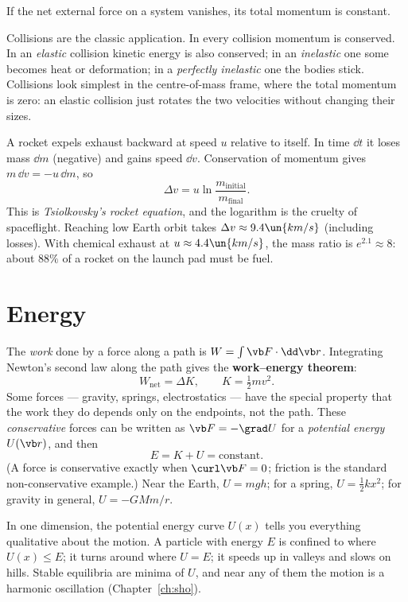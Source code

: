 \begin{law}
If the net external force on a system vanishes, its total momentum is constant.
\end{law}

Collisions are the classic application. In every collision momentum is conserved. In an \emph{elastic} collision kinetic energy is also conserved; in an \emph{inelastic} one some becomes heat or deformation; in a \emph{perfectly inelastic} one the bodies stick. Collisions look simplest in the centre-of-mass frame, where the total momentum is zero: an elastic collision just rotates the two velocities without changing their sizes.

\begin{example}
A rocket expels exhaust backward at speed $u$ relative to itself. In time $\dd t$ it loses mass $\dd m$ (negative) and gains speed $\dd v$. Conservation of momentum gives $m\,\dd v = -u\,\dd m$, so
\[
  \Delta v = u\ln\frac{m_{\text{initial}}}{m_{\text{final}}} .
\]
This is \emph{Tsiolkovsky's rocket equation}, and the logarithm is the cruelty of spaceflight. Reaching low Earth orbit takes $\Delta v\approx9.4\un{km/s}$ (including losses). With chemical exhaust at $u\approx4.4\un{km/s}$, the mass ratio is $e^{2.1}\approx 8$: about $88\%$ of a rocket on the launch pad must be fuel.
\end{example}

\section{Energy}

The \emph{work} done by a force along a path is $W = \int\vb F\cdot\dd\vb r$. Integrating Newton's second law along the path gives the \textbf{work--energy theorem}:
\[
  W_{\text{net}} = \Delta K, \qquad K = \tfrac12 mv^{2}.
\]
Some forces --- gravity, springs, electrostatics --- have the special property that the work they do depends only on the endpoints, not the path. These \emph{conservative} forces can be written as $\vb F = -\grad U$ for a \emph{potential energy} $U(\vb r)$, and then
\[
  E = K + U = \text{constant}.
\]
(A force is conservative exactly when $\curl\vb F=0$; friction is the standard non-conservative example.) Near the Earth, $U = mgh$; for a spring, $U=\tfrac12kx^2$; for gravity in general, $U = -GMm/r$.

\begin{keyidea}
In one dimension, the potential energy curve $U(x)$ tells you everything qualitative about the motion. A particle with energy $E$ is confined to where $U(x)\le E$; it turns around where $U = E$; it speeds up in valleys and slows on hills. Stable equilibria are minima of $U$, and near any of them the motion is a harmonic oscillation (Chapter~\ref{ch:sho}).
\end{keyidea}

